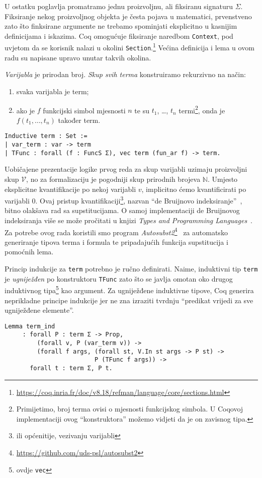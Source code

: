 \noindent U ostatku poglavlja promatramo jednu proizvoljnu, ali fiksiranu signaturu \(\Sigma\).
Fiksiranje nekog proizvoljnog objekta je česta pojava u matematici,
prvenstveno zato što finksirane argumente ne trebamo spominjati eksplicitno u kasnijim definicijama i iskazima.
Coq omogućuje fiksiranje naredbom \texttt{Context},
pod uvjetom da se korisnik nalazi u okolini \texttt{Section}.\footnote{\url{https://coq.inria.fr/doc/v8.18/refman/language/core/sections.html}}
Većina definicija i lema u ovom radu su napisane upravo unutar takvih okolina.

\begin{definition}\label{def:term}
  \textit{Varijabla} je prirodan broj. \textit{Skup svih terma} konstruiramo rekurzivno na način:
  \begin{enumerate}
  \item svaka varijabla je term;
  \item ako je \(f\) funkcijski simbol mjesnosti \(n\) te su \(t_{1}\), \ldots, \(t_{n}\) termi\footnote{Primijetimo, broj terma ovisi o mjesnosti funkcijskog simbola. U Coqovoj implementaciji ovog \enquote{konstruktora} možemo vidjeti da je on zavisnog tipa.},
    onda je \(f(t_{1}, \ldots, t_{n})\) također term.
  \end{enumerate}
\begin{verbatim}
Inductive term : Set :=
| var_term : var -> term 
| TFunc : forall (f : FuncS Σ), vec term (fun_ar f) -> term.
\end{verbatim}
\end{definition}
\noindent Uobičajene prezentacije logike prvog reda za
skup varijabli uzimaju proizvoljni skup \(\mathcal{V}\),
no za formalizaciju je pogodniji skup prirodnih brojeva \(\mathbb{N}\).
Umjesto eksplicitne kvantifikacije po nekoj varijabli \(v\),
implicitno ćemo kvantificirati po varijabli \(0\).
Ovaj pristup kvantifikaciji\footnote{ili općenitije, vezivanju varijabli},
nazvan \enquote{de Bruijnovo indeksiranje}~\cite{debruijnamelessdummies},
bitno olakšava rad sa supstitucijama.
O samoj implementaciji de Bruijnovog indeksiranja više se može pročitati u knjizi
\textit{Types and Programming Languages}~\cite{pierce2002tapl}.
Za potrebe ovog rada koristili smo program \textit{Autosubst2}\footnote{\url{https://github.com/uds-psl/autosubst2}}~\cite{stark-phd,autosubst2}
za automatsko generiranje tipova terma i formula te pripadajućih funkcija supstitucija i pomoćnih lema.

Princip indukcije za \texttt{term} potrebno je ručno definirati.
Naime, induktivni tip \texttt{term} je \textit{ugniježđen} po konstruktoru \texttt{TFunc} zato što
se javlja omotan oko drugog induktivnog tipa\footnote{ovdje \texttt{vec}} kao argument.
Za ugniježđene induktivne tipove, Coq generira neprikladne principe indukcije jer ne zna
izraziti tvrdnju \enquote{predikat vrijedi za sve ugniježđene elemente}.
\begin{verbatim}
Lemma term_ind
     : forall P : term Σ -> Prop,
         (forall v, P (var_term v)) ->
         (forall f args, (forall st, V.In st args -> P st) ->
                         P (TFunc f args)) ->
       forall t : term Σ, P t.
\end{verbatim}

